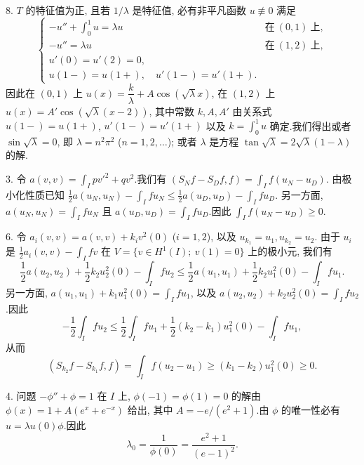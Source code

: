 8. $T$ 的特征值为正, 且若 $1/\lambda$ 是特征值, 必有非平凡函数 $u\not\equiv0$
满足
\begin{equation*}
\begin{cases}
-u''+\int_0^1u=\lambda u & \text{在}\ (0,1)\ \text{上},\\
-u''=\lambda u & \text{在}\ (1,2)\ \text{上},\\
u'(0)=u'(2)=0,\\
u(1-)=u(1+),\quad u'(1-)=u'(1+).
\end{cases}
\end{equation*}
因此在 $(0,1)$ 上 $u(x)=\dfrac k\lambda+A\cos(\sqrt{\lambda}x)$, 在 $(1,2)$
上 $u(x)=A'\cos(\sqrt{\lambda}(x-2))$, 其中常数 $k,A,A'$ 由关系式
$u(1-)=u(1+)$, $u'(1-)=u'(1+)$ 以及 $k=\int_0^1u$ 确定.我们得出或者
$\sin\sqrt{\lambda}=0$, 即 $\lambda=n^2\pi^2$ ($n=1,2,\dots$); 或者 $\lambda$
是方程 $\tan\sqrt{\lambda}=2\sqrt{\lambda}(1-\lambda)$ 的解.


3. 令 $a(v,v)=\int_I pv'^2+qv^2$.我们有 $(S_Nf-S_Df,f)=\int_If(u_N-u_D)$.
由极小化性质已知 $\frac12a(u_N,u_N)-\int_Ifu_N\le\frac12a(u_D,u_D)-\int_Ifu_D$.
另一方面, $a(u_N,u_N)=\int_Ifu_N$ 且 $a(u_D,u_D)=\int_Ifu_D$.因此
$\int_If(u_N-u_D)\ge0$.

6. 令 $a_i(v,v)=a(v,v)+k_iv^2(0)$ ($i=1,2$), 以及 $u_{k_1}=u_1,u_{k_2}=u_2$.
由于 $u_i$ 是 $\frac12a_i(v,v)-\int_Ifv$ 在 $V=\{v\in H^1(I);\ v(1)=0\}$
上的极小元, 我们有
\begin{equation*}
\frac12a(u_2,u_2)+\frac12k_2u_2^2(0)-\int_Ifu_2
\le\frac12a(u_1,u_1)+\frac12k_2u_1^2(0)-\int_Ifu_1.
\end{equation*}
另一方面, $a(u_1,u_1)+k_1u_1^2(0)=\int_Ifu_1$, 以及
$a(u_2,u_2)+k_2u_2^2(0)=\int_Ifu_2$.因此
\begin{equation*}
-\frac12\int_Ifu_2\le\frac12\int_Ifu_1+\frac12(k_2-k_1)u_1^2(0)-\int_Ifu_1,
\end{equation*}
从而
\begin{equation*}
(S_{k_2}f-S_{k_1}f,f)=\int_If(u_2-u_1)\ge(k_1-k_2)u_1^2(0)\ge0.
\end{equation*}


4. 问题 $-\phi''+\phi=1$ 在 $I$ 上, $\phi(-1)=\phi(1)=0$ 的解由
$\phi(x)=1+A(e^x+e^{-x})$ 给出, 其中 $A=-e/(e^2+1)$.由 $\phi$ 的唯一性必有
$u=\lambda u(0)\phi$.因此
\begin{equation*}
\lambda_0=\frac{1}{\phi(0)}=\frac{e^2+1}{(e-1)^2}.
\end{equation*}

